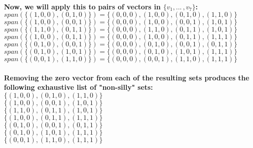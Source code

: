 \documentclass{article}
\begin{document}
\paragraph{\large
Now, we will apply this to pairs of vectors in $\{v_1, ...\,, v_7\}$:
\\\indent $span(\{(1, 0, 0), (0, 1, 0)\}) = \{(0, 0, 0), (1, 0, 0), (0, 1, 0), (1, 1, 0)\}$
\\\indent $span(\{(1, 0, 0), (0, 0, 1)\}) = \{(0, 0, 0), (1, 0, 0), (0, 0, 1), (1, 0, 1)\}$
\\\indent $span(\{(1, 1, 0), (0, 1, 1)\}) = \{(0, 0, 0), (1, 1, 0), (0, 1, 1), (1, 0, 1)\}$
\\\indent $span(\{(1, 0, 0), (0, 1, 1)\}) = \{(0, 0, 0), (1, 0, 0), (0, 1, 1), (1, 1, 1)\}$
\\\indent $span(\{(0, 1, 0), (0, 0, 1)\}) = \{(0, 0, 0), (0, 1, 0), (0, 0, 1), (0, 1, 1)\}$
\\\indent $span(\{(0, 1, 0), (1, 0, 1)\}) = \{(0, 0, 0), (0, 1, 0), (1, 0, 1), (1, 1, 1)\}$
\\\indent $span(\{(0, 0, 1), (1, 1, 0)\}) = \{(0, 0, 0), (0, 0, 1), (1, 1, 0), (1, 1, 1)\}$}

\paragraph{\large
Removing the zero vector from each of the resulting sets produces the following exhaustive list of "non-silly" sets:
\\\indent $\{(1, 0, 0), (0, 1, 0), (1, 1, 0)\}$
\\\indent $\{(1, 0, 0), (0, 0, 1), (1, 0, 1)\}$
\\\indent $\{(1, 1, 0), (0, 1, 1), (1, 0, 1)\}$
\\\indent $\{(1, 0, 0), (0, 1, 1), (1, 1, 1)\}$
\\\indent $\{(0, 1, 0), (0, 0, 1), (0, 1, 1)\}$
\\\indent $\{(0, 1, 0), (1, 0, 1), (1, 1, 1)\}$
\\\indent $\{(0, 0, 1), (1, 1, 0), (1, 1, 1)\}$}
\end{document}
